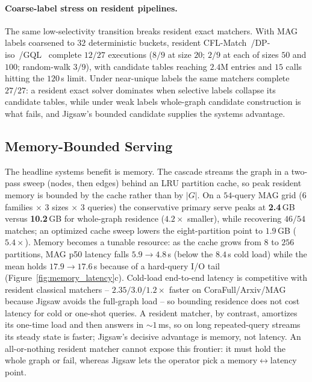 \documentclass[sigconf, nonacm]{acmart}
\begin{document}
\paragraph{Coarse-label stress on resident pipelines.}
The same low-selectivity transition breaks resident exact matchers. With MAG labels coarsened to $32$ deterministic buckets, resident CFL-Match~\cite{ref_cflmatch}/DP-iso~\cite{ref_daf}/GQL~\cite{ref_graphql} complete $12/27$ executions ($8/9$ at size $20$; $2/9$ at each of sizes $50$ and $100$; random-walk $3/9$), with candidate tables reaching $2.4$M entries and $15$ calls hitting the $120$\,s limit. Under near-unique labels the same matchers complete $27/27$: a resident exact solver dominates when selective labels collapse its candidate tables, while under weak labels whole-graph candidate construction is what fails, and Jigsaw's bounded candidate supplies the systems advantage.

\subsection{Memory-Bounded Serving}
\label{sec:memory}

The headline systems benefit is memory. The cascade streams the graph in a two-pass sweep (nodes, then edges) behind an LRU partition cache, so peak resident memory is bounded by the cache rather than by $|G|$. On a $54$-query MAG grid (6 families $\times$ 3 sizes $\times$ 3 queries) the conservative primary serve peaks at \textbf{2.4}\,GB versus \textbf{10.2}\,GB for whole-graph residence ($4.2\times$ smaller), while recovering $46/54$ matches; an optimized cache sweep lowers the eight-partition point to $1.9$\,GB ($5.4\times$). Memory becomes a tunable resource: as the cache grows from $8$ to $256$ partitions, MAG p50 latency falls $5.9{\to}4.8$\,s (below the $8.4$\,s cold load) while the mean holds $17.9{\to}17.6$\,s because of a hard-query I/O tail (Figure~\ref{fig:memory_latency}c). Cold-load end-to-end latency is competitive with resident classical matchers -- $2.35/3.0/1.2\times$ faster on CoraFull/Arxiv/MAG because Jigsaw avoids the full-graph load -- so bounding residence does not cost latency for cold or one-shot queries. A resident matcher, by contrast, amortizes its one-time load and then answers in ${\sim}1$\,ms, so on long repeated-query streams its steady state is faster; Jigsaw's decisive advantage is memory, not latency. An all-or-nothing resident matcher cannot expose this frontier: it must hold the whole graph or fail, whereas Jigsaw lets the operator pick a memory$\leftrightarrow$latency point.
\end{document}
